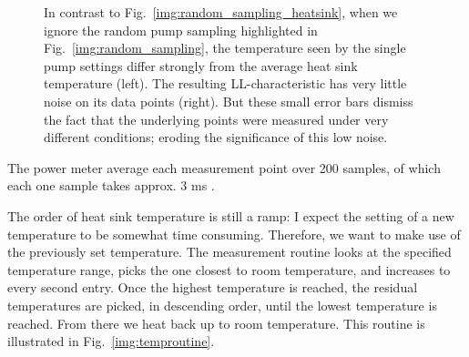 \begin{figure}
\centering
{}
\caption{In contrast to Fig.~\ref{img:random_sampling_heatsink},
when we ignore the random pump sampling
highlighted in Fig.~\ref{img:random_sampling},
the temperature seen by the single pump settings
differ strongly from the average heat sink temperature
(left).
The resulting LL-characteristic
has very little noise on its data points
(right).
But these small error bars dismiss the fact
that the underlying points were measured
under very different conditions;
eroding the significance
of this low noise.}
\label{img:random_sampling_ramp_heatsink}
\end{figure}

The power meter average each measurement point
over 200 samples,
of which each one sample
takes approx. 3 ms \cite{ThorlabsPM}.

The order of heat sink temperature
is still a ramp:
I expect the setting of a new temperature to be somewhat time consuming.
Therefore, we want to make use of the previously set temperature.
The measurement routine looks at the specified temperature range,
picks the one closest to room temperature,
and increases to every second entry.
Once the highest temperature is reached,
the residual temperatures are picked,
in descending order, until the lowest temperature is reached.
From there we heat back up to room temperature.
This routine is illustrated in Fig.~\ref{img:temproutine}.

